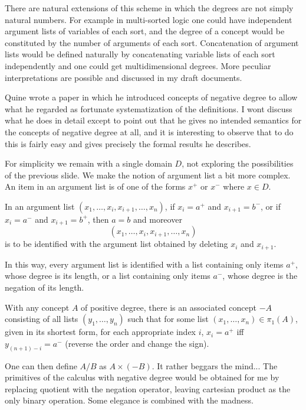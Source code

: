 \documentclass{slides}
\begin{document}
\begin{slide}

There are natural extensions of this scheme in which the degrees are not simply natural numbers.  For example in multi-sorted logic one could have independent argument lists of variables of each sort, and the degree of a concept would be constituted by the number of arguments of each sort.  Concatenation of argument
lists would be defined naturally by concatenating variable lists of each sort independently and one could get multidimensional degrees.  More peculiar interpretations are possible and discussed in my draft documents.

\end{slide}

\begin{slide}

Quine wrote a paper in which he introduced concepts of negative degree to allow what he regarded as fortunate systematization of the definitions.  I wont discuss what he does in detail except to point out that he gives no intended semantics for the concepts of negative degree at all, and it is interesting to observe that to do this is fairly easy and gives precisely the formal results he describes.

For simplicity we remain with a single domain $D$, not exploring the possibilities of the previous slide.  We make the notion of argument list
a bit more complex.  An item in an argument list is of one of the forms $x^+$ or $x^-$ where $x \in D$.  

In an argument list $(x_1,\ldots,x_i,x_{i+1},\ldots,x_n)$, if $x_i = a^+$ and $x_{i+1} = b^-$, or if $x_i = a^-$ and $x_{i+1} = b^+$, then
$a=b$ and moreover $$(x_1,\ldots,x_i,x_{i+1},\ldots,x_n)$$ is to be identified with the argument list obtained by deleting $x_i$ and $x_{i+1}$.

In this way, every argument list is identified with a list containing only items $a^+$, whose degree is its length, or a list containing only items
$a^-$, whose degree is the negation of its length.

With any concept $A$ of positive degree, there is an associated concept $-A$ consisting of all lists $(y_1,\ldots,y_n)$ such that for some
list $(x_1,\ldots,x_n) \in \pi_1(A)$, given in its shortest form, for each appropriate index $i$, $x_i=a^+$ iff $y_{(n+1)-i} = a^-$ (reverse the order and change the sign).

One can then define $A /B$ as $A \times (-B)$.  It rather beggars the mind...  The primitives of the calculus with negative degree would be obtained for me
by replacing quotient with the negation operator, leaving cartesian product as the only binary operation.  Some elegance is combined with the madness.


\end{slide}
\end{document}

